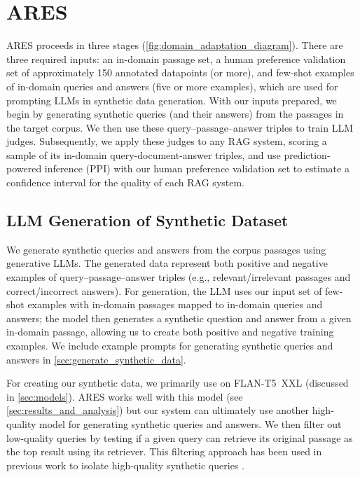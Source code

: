 


\section{ARES}
\label{sec:methods}




ARES proceeds in three stages (\autoref{fig:domain_adaptation_diagram}). 
There are three required inputs: an in-domain passage set, a human preference validation set of approximately 150 annotated datapoints (or more), and few-shot examples of in-domain queries and answers (five or more examples), which are used for prompting LLMs in synthetic data generation.
With our inputs prepared, we begin by generating synthetic queries (and their answers) from the passages in the target corpus. We then use these query--passage--answer triples to train LLM judges.
Subsequently, we apply these judges to any RAG system, scoring a sample of its in-domain query-document-answer triples, and use prediction-powered inference (PPI) with our human preference validation set to estimate a confidence interval for the quality of each RAG system.


\subsection{LLM Generation of Synthetic Dataset}

We generate synthetic queries and answers from the corpus passages using generative LLMs.
The generated data represent both positive and negative examples of query--passage--answer triples (e.g., relevant/irrelevant passages and correct/incorrect answers). 
For generation, the LLM uses our input set of few-shot examples with in-domain passages mapped to in-domain queries and answers; the model then generates a synthetic question and answer from a given in-domain passage, allowing us to create both positive and negative training examples. 
We include example prompts for generating synthetic queries and answers in \ref{sec:generate_synthetic_data}.

For creating our synthetic data, we primarily use on FLAN-T5~XXL (discussed in  \autoref{sec:models}). 
ARES works well with this model (see  \autoref{sec:results_and_analysis}) but our system can ultimately use another high-quality model for generating synthetic queries and answers.
We then filter out low-quality queries by testing if a given query can retrieve its original passage as the top result using its retriever.
This filtering approach has been used in previous work to isolate high-quality synthetic queries \cite{dai2022promptagator, saad2023udapdr}.

